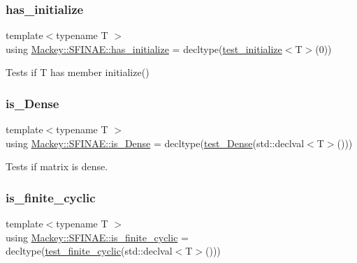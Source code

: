 \subsubsection{\texorpdfstring{has\+\_\+initialize}{has\_initialize}}
{\footnotesize\ttfamily template$<$typename T $>$ \\
using \hyperlink{structMackey_1_1SFINAE_a9f27bd555a411026939195401277642d}{Mackey\+::\+S\+F\+I\+N\+A\+E\+::has\+\_\+initialize} =  decltype(\hyperlink{structMackey_1_1SFINAE_a1734bf7c631d052255bd1d5f96fb0b21}{test\+\_\+initialize}$<$T$>$(0))}



Tests if T has member initialize() 

\mbox{\label{structMackey_1_1SFINAE_a1cea78d0d105adaafa9a77d13a77b790}} 
\subsubsection{\texorpdfstring{is\+\_\+\+Dense}{is\_Dense}}
{\footnotesize\ttfamily template$<$typename T $>$ \\
using \hyperlink{structMackey_1_1SFINAE_a1cea78d0d105adaafa9a77d13a77b790}{Mackey\+::\+S\+F\+I\+N\+A\+E\+::is\+\_\+\+Dense} =  decltype(\hyperlink{structMackey_1_1SFINAE_a1b75937bad3b6d9d0eaff8bd81a03b16}{test\+\_\+\+Dense}(std\+::declval$<$T$>$()))}



Tests if matrix is dense. 

\mbox{\label{structMackey_1_1SFINAE_ac37cce8f1f1220e29653dbcc5f0b7090}} 
\subsubsection{\texorpdfstring{is\+\_\+finite\+\_\+cyclic}{is\_finite\_cyclic}}
{\footnotesize\ttfamily template$<$typename T $>$ \\
using \hyperlink{structMackey_1_1SFINAE_ac37cce8f1f1220e29653dbcc5f0b7090}{Mackey\+::\+S\+F\+I\+N\+A\+E\+::is\+\_\+finite\+\_\+cyclic} =  decltype(\hyperlink{structMackey_1_1SFINAE_a2dd0f9b571ad5911cf90ae93a8e52d90}{test\+\_\+finite\+\_\+cyclic}(std\+::declval$<$T$>$()))}




